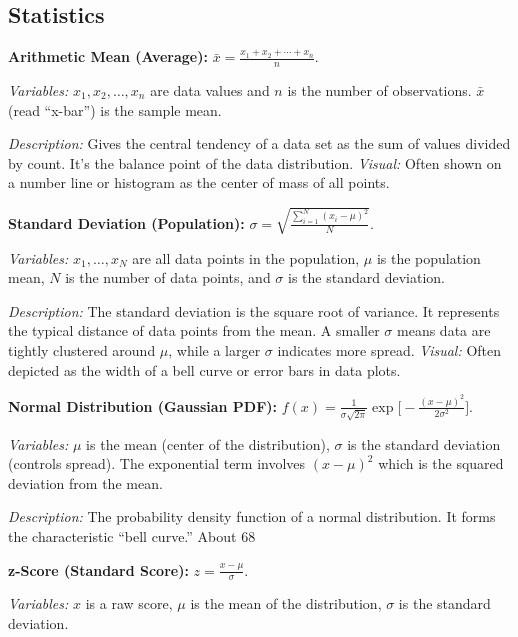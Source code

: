 \documentclass{article}
\begin{document}
\subsection*{Statistics}

\textbf{Arithmetic Mean (Average):} $\displaystyle \bar{x} = \frac{x_1 + x_2 + \cdots + x_n}{n}$.

\textit{Variables:} $x_1, x_2, \dots, x_n$ are data values and $n$ is the number of observations. $\bar{x}$ (read “x-bar”) is the sample mean.

\textit{Description:} Gives the central tendency of a data set as the sum of values divided by count. It’s the balance point of the data distribution. \textit{Visual:} Often shown on a number line or histogram as the center of mass of all points.

\textbf{Standard Deviation (Population):} $\displaystyle \sigma = \sqrt{\frac{\sum_{i=1}^{N}(x_i - \mu)^2}{N}}$.

\textit{Variables:} $x_1, \dots, x_N$ are all data points in the population, $\mu$ is the population mean, $N$ is the number of data points, and $\sigma$ is the standard deviation.

\textit{Description:} The standard deviation is the square root of variance. It represents the typical distance of data points from the mean. A smaller $\sigma$ means data are tightly clustered around $\mu$, while a larger $\sigma$ indicates more spread. \textit{Visual:} Often depicted as the width of a bell curve or error bars in data plots.

\textbf{Normal Distribution (Gaussian PDF):} $\displaystyle f(x) = \frac{1}{\sigma \sqrt{2\pi}} \exp\!\Big[-\frac{(x-\mu)^2}{2\sigma^2}\Big]$.

\textit{Variables:} $\mu$ is the mean (center of the distribution), $\sigma$ is the standard deviation (controls spread). The exponential term involves $(x-\mu)^2$ which is the squared deviation from the mean.

\textit{Description:} The probability density function of a normal distribution. It forms the characteristic “bell curve.” About 68%

\textbf{z-Score (Standard Score):} $z = \frac{x - \mu}{\sigma}$.

\textit{Variables:} $x$ is a raw score, $\mu$ is the mean of the distribution, $\sigma$ is the standard deviation.
\end{document}
